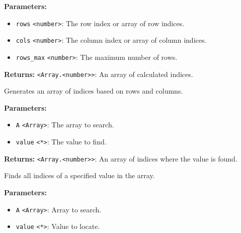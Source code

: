\documentclass[12pt,a4paper]{article}
\begin{document}
\vspace{5mm}
\noindent {}


\noindent \textbf{Parameters:}
\begin{itemize}
  \item \texttt{rows} \texttt{<number>}: The row index or array of row indices.
  \item \texttt{cols} \texttt{<number>}: The column index or array of column indices.
  \item \texttt{rows\_max} \texttt{<number>}: The maximum number of rows.
\end{itemize}

\noindent \textbf{Returns:} \texttt{<Array.<number>>}: An array of calculated indices.

\noindent Generates an array of indices based on rows and columns.

\vspace{5mm}
\noindent {}


\noindent \textbf{Parameters:}
\begin{itemize}
  \item \texttt{A} \texttt{<Array>}: The array to search.
  \item \texttt{value} \texttt{<*>}: The value to find.
\end{itemize}

\noindent \textbf{Returns:} \texttt{<Array.<number>>}: An array of indices where the value is found.

\noindent Finds all indices of a specified value in the array.

\vspace{5mm}
\noindent {}


\noindent \textbf{Parameters:}
\begin{itemize}
  \item \texttt{A} \texttt{<Array>}: Array to search.
  \item \texttt{value} \texttt{<*>}: Value to locate.
\end{itemize}
\end{document}
